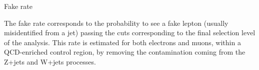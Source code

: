 \documentclass[handout,8 pt]{beamer}
\begin{document}
\begin{frame}{Fake rate}

	\justifying
	The fake rate corresponds to the probability to see a fake lepton (usually misidentified from a jet) passing the cuts corresponding to the final selection level of the analysis. This rate is estimated for both electrons and muons, within a QCD-enriched control region, by removing the contamination coming from the Z+jets and W+jets processes. \vfill

\hspace{4pt}
   \begin{minipage}[c]{.02\linewidth}
	\begin{exampleblock}{}  \end{exampleblock}
   \end{minipage}	
   \hspace{5pt}	
	\begin{minipage}[c]{.48\linewidth}
   \end{minipage} \hfill
   \begin{minipage}[c]{.48\linewidth}
   \end{minipage} \hfill
   
   \vspace{-8pt}
   

\end{frame}
\end{document}
